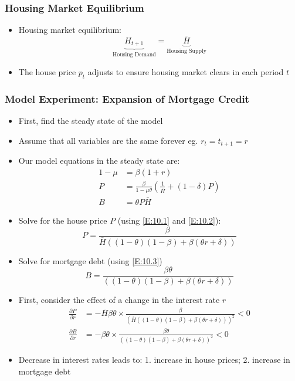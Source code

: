 \documentclass[a4paper]{article}
\begin{document}
\subsubsection{Housing Market Equilibrium}
	\begin{itemize}
		\item Housing market equilibrium:
		\[
			\underbrace{H_{t+1}}_\text{Housing Demand} = \underbrace{\overline{H}}_\text{Housing Supply}
		\]
		\item The house price \( p_t \) adjusts to ensure housing market clears in each period \( t \)
	\end{itemize}
\subsubsection{Model Experiment: Expansion of Mortgage Credit}
	\begin{itemize}
		\item First, find the \textcolor{myblue}{steady state} of the model
		\item Assume that all variables are the same forever eg. \( r_t=t_{t+1}=r \)
		\item Our model equations in the steady state are:
		\begin{align}
			1-\mu &= \beta(1+r) \label{E:10.1}\\
			P &= \frac{\beta}{1-\mu\theta} \left( \frac{1}{\overline{H}} + (1-\delta)P \right) \label{E:10.2}\\
			B &= \theta P\overline{H} \label{E:10.3}
		\end{align}
		\item Solve for the house price \( P \) (using \cref{E:10.1} and \cref{E:10.2}):
		\[
			P = \frac{\beta}{\overline{H}((1-\theta)(1-\beta)+\beta(\theta r+\delta))}
		\]
		\item Solve for mortgage debt (using \cref{E:10.3})
		\[
			B = \frac{\beta\theta}{((1-\theta)(1-\beta)+\beta(\theta r+\delta))}
		\]
		\item First, consider the effect of a \textcolor{myblue}{change in the interest rate \( \mathit{r} \)}
		\begin{align*}
			\frac{\partial P}{\partial r} &= -\overline{H}\beta\theta \times \frac{\beta}{(\overline{H}((1-\theta)(1-\beta)+\beta(\theta r+\delta)))^2} <0\\
			\frac{\partial B}{\partial r} &= -\beta\theta \times \frac{\beta\theta}{((1-\theta)(1-\beta)+\beta(\theta r+\delta))^2} <0
		\end{align*}
		\item Decrease in interest rates leads to: 1. \textcolor{myblue}{increase in house prices}; 2. \textcolor{myblue}{increase in mortgage debt}

\end{itemize}
\end{document}
